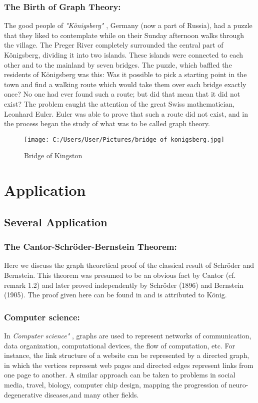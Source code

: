 \documentclass[12pt,letterpaper]{report}
\begin{document}
{\subsection{{\color{blue} The Birth of Graph Theory:}}{\Huge \color{magenta}T}he good people of {\color{green}\textit{"Königsberg"} }, Germany (now a part of Russia), had a puzzle that they liked to contemplate while on their Sunday afternoon walks through the village. The Preger River completely surrounded the central part of Königsberg, dividing it into two islands. These islands were connected to each other and to the mainland by seven bridges. The puzzle, which baffled the residents of Königsberg was this: Was it possible to pick a starting point in the town and find a walking route which would take them over each bridge exactly once? No one had ever found such a route; but did that mean that it did not exist? The problem caught the attention of the great Swiss mathematician, Leonhard Euler. Euler was able to prove that such a route did not exist, and in the process began the study of what was to be called graph theory.
\begin{figure}
\centering 
\texttt{[image: C:/Users/User/Pictures/bridge of konigsberg.jpg]}\\
\caption{Bridge of Kingston }
\end{figure}
  
\newpage
\chapter{Application}
\section{Several Application}
\subsection{{\color{teal}The Cantor-Schröder-Bernstein Theorem:}}Here we discuss the graph theoretical proof of the classical result of Schröder and Bernstein. This theorem was presumed to be an obvious fact by Cantor (cf. remark 1.2) and later proved independently by Schröder (1896) and Bernstein (1905). The proof given here can be found in  and is attributed to König.
\subsection{{\color{blue} Computer science:}}In {\color{green}\textit{Computer science"} }, graphs are used to represent networks of communication, data organization, computational devices, the flow of computation, etc. For instance, the link structure of a website can be represented by a directed graph, in which the vertices represent web pages and directed edges represent links from one page to another. A similar approach can be taken to problems in social media, travel, biology, computer chip design, mapping the progression of neuro-degenerative diseases,and many other fields.
\begin{tikzpicture}[auto, node distance=3cm, every loop/.style={},
                    thick,main node/.style={circle,draw,fill=blue!50,font=\sffamily\Large\bfseries}]


\end{tikzpicture}}
\end{document}
